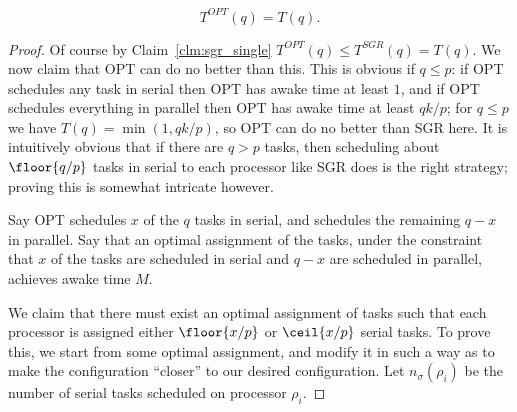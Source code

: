 \begin{claim}
  \label{clm:opt_single}
  $$T^{OPT}(q) = T(q).$$
\end{claim}
\begin{proof}
  Of course by Claim~\ref{clm:sgr_single} $T^{OPT}(q) \le
  T^{SGR}(q) = T(q)$. We now claim that OPT can do no better than
  this. This is obvious if $q \le p$: if OPT schedules any task
  in serial then OPT has awake time at least $1$, and if OPT
  schedules everything in parallel then OPT has awake time at
  least $qk/p$; for $q\le p$ we have $T(q) = \min(1, qk/p)$, so
  OPT can do no better than SGR here. It is intuitively obvious
  that if there are $q> p$ tasks, then scheduling about
  $\floor{q/p}$ tasks in serial to each processor like SGR does
  is the right strategy; proving this is somewhat intricate
  however.

  Say OPT schedules $x$ of the $q$ tasks in serial, and
  schedules the remaining $q-x$ in parallel.
  Say that an optimal assignment of the tasks, under the constraint
  that $x$ of the tasks are scheduled in serial and $q-x$ are
  scheduled in parallel, achieves awake time $M$.

  We claim that there must exist an optimal assignment of tasks
  such that each processor is assigned either $\floor{x/p}$ or
  $\ceil{x/p}$ serial tasks. To prove this, we start from some
  optimal assignment, and modify it in such a way as to make the
  configuration \enquote{closer} to our desired configuration.
  Let $n_\sigma(\rho_i)$ be the number of serial tasks scheduled
  on processor $\rho_i$.


\end{proof}
